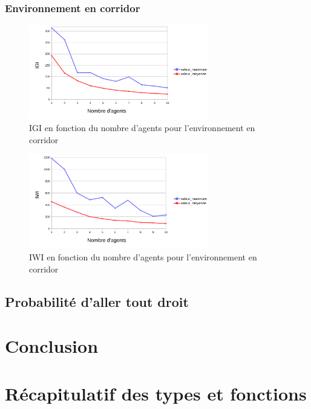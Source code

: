 \documentclass{article}
\begin{document}
        \subsubsection{Environnement en corridor}
            \begin{figure}[!h]
                \begin{center}
                    \includegraphics[width = 0.7\textwidth]{graphes pdf/variance tortues IGI corridor.pdf}
                    \caption{IGI en fonction du nombre d'agents pour l'environnement en corridor}
                \end{center}
            \end{figure}
            \begin{figure}[!h]
                \begin{center}
                    \includegraphics[width = 0.7\textwidth]{graphes pdf/variance tortues IWI corridor.pdf}
                    \caption{IWI en fonction du nombre d'agents pour l'environnement en corridor}
                \end{center}
            \end{figure}
            \newpage
    \subsection{Probabilité d'aller tout droit}
\section{Conclusion}
    \subsection{}

\appendix
\newpage
\section{Récapitulatif des types et fonctions}
\end{document}
